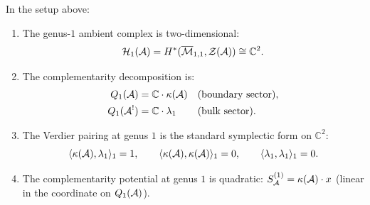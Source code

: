 \begin{theorem}
\label{thm:thqg-III-genus-1-holographic}
In the setup above:
\begin{enumerate}[label=\textup{(\roman*)}]
\item The genus-$1$ ambient complex is two-dimensional:
 \begin{equation}\label{eq:thqg-III-genus-1-ambient}
 \mathcal{H}_1(\mathcal{A})
 = H^*(\overline{\mathcal{M}}_{1,1}, \mathcal{Z}(\mathcal{A}))
 \cong \mathbb{C}^2.
 \end{equation}

\item The complementarity decomposition is:
 \begin{align}
 Q_1(\mathcal{A}) &= \mathbb{C} \cdot \kappa(\mathcal{A})
 &&\text{\textup{(}boundary sector\textup{)}},
 \label{eq:thqg-III-genus-1-boundary}
 \\
 Q_1(\mathcal{A}^!) &= \mathbb{C} \cdot \lambda_1
 &&\text{\textup{(}bulk sector\textup{)}}.
 \label{eq:thqg-III-genus-1-bulk}
 \end{align}

\item The Verdier pairing at genus $1$ is the standard
 symplectic form on $\mathbb{C}^2$:
 \begin{equation}\label{eq:thqg-III-genus-1-pairing}
 \langle \kappa(\mathcal{A}), \lambda_1 \rangle_1 = 1,
 \qquad
 \langle \kappa(\mathcal{A}), \kappa(\mathcal{A}) \rangle_1 = 0,
 \qquad
 \langle \lambda_1, \lambda_1 \rangle_1 = 0.
 \end{equation}

\item The complementarity potential at genus $1$ is quadratic:
 $S_{\mathcal{A}}^{(1)} = \kappa(\mathcal{A}) \cdot x$
 \textup{(}linear in the coordinate on $Q_1(\mathcal{A})$\textup{)}.
\end{enumerate}
\end{theorem}

